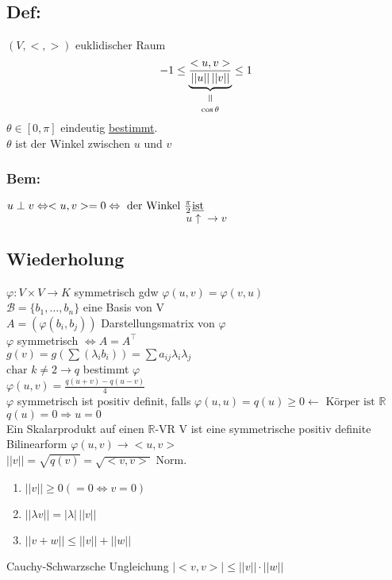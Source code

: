 \documentclass[titlepage,12pt,a4paper,ngerman]{report}
\newcommand{\verteq}{\rotatebox{90}{$\,=$}}
\newcommand{\equalto}[2]{\underset{\scriptstyle\overset{\mkern4mu\verteq}{#2}}{#1}}
\newcommand{\tx}[1]{\textrm{#1}}
\newcommand{\ub}[1]{\underbrace{#1}}
\begin{document}
\subsection{Def:}
$ (V,<,>) $ euklidischer Raum
$$ -1 \le \equalto{\ub{ \frac{<u,v>}{||u||\, ||v||} }}{\cos \theta} \le 1$$
$ \theta \in [0,\pi] $ eindeutig \underline{bestimmt}.\\
$ \theta $ ist der Winkel zwischen $ u $ und $ v $
\subsubsection*{Bem:}
$ u \perp v \Leftrightarrow <u,v> = 0 \Leftrightarrow \tx{ der Winkel } \frac{\pi}{2} \tx{\underline{ist}} $
$$ u \uparrow \rightarrow v$$


\subsection{Wiederholung}
$ \varphi : V \times V \to K $
symmetrisch gdw $ \varphi(u,v) = \varphi(v,u) $\\
$ \mathcal{B}= \{b_1,\dots, b_n\} $ eine Basis von V \\
$A = (\varphi(b_i,b_j)) $ Darstellungsmatrix von $ \varphi $\\
$ \varphi $ symmetrisch $ \Leftrightarrow  A = A^\top$\\
$ g(v) = g(\sum(\lambda_i b_i)) =\sum a_{ij} \lambda_i \lambda_j $\\
$ \tx{char } k \neq 2 \rightarrow q $ bestimmt $ \varphi $\\
$ \varphi(u,v) = \frac{q(u+v) - q(u-v)}{4} $\\
$ \varphi $ symmetrisch ist positiv definit, falls $ \varphi(u,u) = q(u) \ge 0 \leftarrow \tx{ Körper ist } \mathbb{R} $\\
$ q(u) = 0 \Rightarrow u = 0 $\\
Ein Skalarprodukt auf einen $ \mathbb{R} $-VR V ist eine symmetrische positiv definite Bilinearform
$ \varphi(u,v) \to <u,v> $\\
$ ||v||=\sqrt{q(v)} = \sqrt{<v,v>}$ Norm. \\
\begin{enumerate}[1)]
	\item $ ||v||\ge 0 ( = 0 \Leftrightarrow v = 0) $
	\item $ ||\lambda v || = | \lambda|\, ||v|| $
	\item $ ||v+w|| \le ||v|| + ||w|| $
\end{enumerate}
Cauchy-Schwarzsche Ungleichung $ |<v,v>| \le ||v|| \cdot ||w|| $
\end{document}

